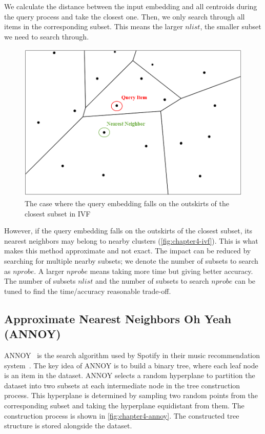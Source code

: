 We calculate the distance between the input embedding and all centroids during the query process and take the closest one. Then, we only search through all items in the corresponding subset. This means the larger $nlist$, the smaller subset we need to search through. 

\begin{figure}[h!]
    \centering
    \includegraphics[width=0.7\linewidth]{content/resources/images/fashion-recommendation/chapter4-ivf.png}
    \caption{The case where the query embedding falls on the outskirts of the closest subset in IVF}
    \label{fig:chapter4-ivf}
\end{figure}

However, if the query embedding falls on the outskirts of the closest subset, its nearest neighbors may belong to nearby clusters (\autoref{fig:chapter4-ivf}). This is what makes this method approximate and not exact. The impact can be reduced by searching for multiple nearby subsets; we denote the number of subsets to search as $nprobe$. A larger $nprobe$ means taking more time but giving better accuracy. The number of subsets $nlist$ and the number of subsets to search $nprobe$ can be tuned to find the time/accuracy reasonable trade-off. 

\subsection{Approximate Nearest Neighbors Oh Yeah (ANNOY)}
ANNOY~\cite{Erik-Github-Annoy} is the search algorithm used by Spotify in their music recommendation system~\cite{Erik-Github-Annoy}. The key idea of ANNOY is to build a binary tree, where each leaf node is an item in the dataset. ANNOY selects a random hyperplane to partition the dataset into two subsets at each intermediate node in the tree construction process. This hyperplane is determined by sampling two random points from the corresponding subset and taking the hyperplane equidistant from them. The construction process is shown in \autoref{fig:chapter4-annoy}. The constructed tree structure is stored alongside the dataset.

